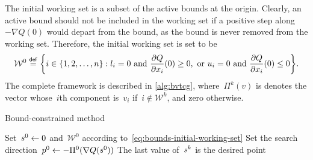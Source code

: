 The initial working set is a subset of the active bounds at the origin.
Clearly, an active bound should not be included in the working set if a positive step along~$-\nabla Q(0)$ would depart from the bound, as the bound is never removed from the working set.
Therefore, the initial working set is set to be
\begin{equation}
    \label{eq:bounds-initial-working-set}
    \mathcal{W}^0 \eqdef \set[\bigg]{i \in \set{1, 2, \dots, n} : \xl_i = 0 ~ \text{and} ~ \frac{\partial Q}{\partial \iter_i}(0) \ge 0, ~ \text{or} ~ \xu_i = 0 ~ \text{and} ~ \frac{\partial Q}{\partial \iter_i}(0) \le 0}.
\end{equation}
The complete framework is described in \cref{alg:bvtcg}, where~$\Pi^k(v)$ is denotes the vector whose~$i$th component is~$v_i$ if~$i \notin \mathcal{W}^k$, and zero otherwise.

\begin{algorithm}
    \caption{Bound-constrained  method}
    \label{alg:bvtcg}
    \DontPrintSemicolon
    \onehalfspacing
    Set~$\sstep[0] \gets 0$ and~$\mathcal{W}^0$ according to~\cref{eq:bounds-initial-working-set}\;
    Set the search direction~$\pstep[0] \gets -\Pi^0(\nabla Q(\sstep[0]))$\;
    The last value of~$\sstep[k]$ is the desired point\;
\end{algorithm}

